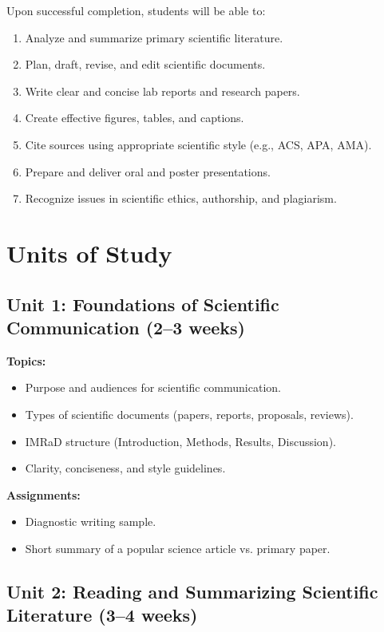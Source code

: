 \documentclass[12pt,oneside]{book}
\begin{document}
Upon successful completion, students will be able to:

\begin{enumerate}
    \item Analyze and summarize primary scientific literature.
    \item Plan, draft, revise, and edit scientific documents.
    \item Write clear and concise lab reports and research papers.
    \item Create effective figures, tables, and captions.
    \item Cite sources using appropriate scientific style (e.g., ACS, APA, AMA).
    \item Prepare and deliver oral and poster presentations.
    \item Recognize issues in scientific ethics, authorship, and plagiarism.
\end{enumerate}

\section{Units of Study}

\subsection{Unit 1: Foundations of Scientific Communication (2--3 weeks)}

\textbf{Topics:}
\begin{itemize}
    \item Purpose and audiences for scientific communication.
    \item Types of scientific documents (papers, reports, proposals, reviews).
    \item IMRaD structure (Introduction, Methods, Results, Discussion).
    \item Clarity, conciseness, and style guidelines.
\end{itemize}

\textbf{Assignments:}
\begin{itemize}
    \item Diagnostic writing sample.
    \item Short summary of a popular science article vs. primary paper.
\end{itemize}

\subsection{Unit 2: Reading and Summarizing Scientific Literature (3--4 weeks)}
\end{document}
